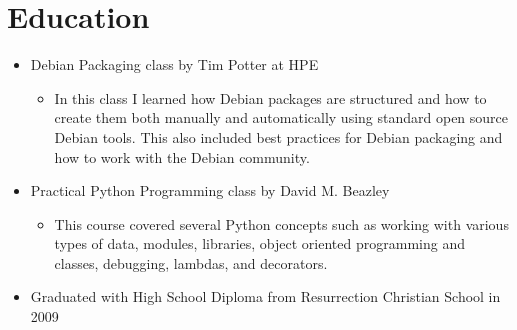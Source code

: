 \documentclass[a4paper,10pt]{article}
\begin{document}
    \section*{Education}
        \begin{itemize}
            \item Debian Packaging class by Tim Potter at HPE
            \begin{itemize}
                \item In this class I learned how Debian packages are structured and how to create them both manually and automatically using standard open source Debian tools. This also included best practices for Debian packaging and how to work with the Debian community.
            \end{itemize}
            \item Practical Python Programming class by David M. Beazley
            \begin{itemize}
                \item This course covered several Python concepts such as working with various types of data, modules, libraries, object oriented programming and classes, debugging, lambdas, and decorators.
            \end{itemize}
            \item Graduated with High School Diploma from Resurrection Christian School in 2009
        \end{itemize}
\end{document}
